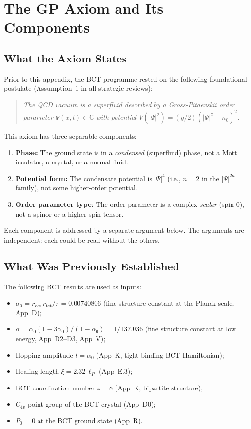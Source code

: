 \documentclass[11pt,a4paper]{article}
\theoremstyle{bctthm}
\theoremstyle{definition}
\begin{document}
\section{The GP Axiom and Its Components}

\subsection{What the Axiom States}

Prior to this appendix, the BCT programme rested on the following
foundational postulate (Assumption~1 in all strategic reviews):

\begin{quote}
\textit{The QCD vacuum is a superfluid described by a Gross-Pitaevskii
order parameter $\Psi(x,t) \in \mathbb{C}$ with potential
$V(|\Psi|^2) = (g/2)(|\Psi|^2 - n_0)^2$.}
\end{quote}

This axiom has three separable components:

\begin{enumerate}
\item \textbf{Phase:} The ground state is in a \emph{condensed} (superfluid)
phase, not a Mott insulator, a crystal, or a normal fluid.
\item \textbf{Potential form:} The condensate potential is $|\Psi|^4$
(i.e., $n=2$ in the $|\Psi|^{2n}$ family), not some higher-order potential.
\item \textbf{Order parameter type:} The order parameter is a complex
\emph{scalar} (spin-0), not a spinor or a higher-spin tensor.
\end{enumerate}

Each component is addressed by a separate argument below. The
arguments are independent: each could be read without the others.

\subsection{What Was Previously Established}

The following BCT results are used as inputs:
\begin{itemize}
\item $\alpha_0 = r_\mathrm{oct}\,r_\mathrm{tet}/\pi = 0.00740806$
(fine structure constant at the Planck scale, App~D);
\item $\alpha = \alpha_0(1-3\alpha_0)/(1-\alpha_0) = 1/137.036$
(fine structure constant at low energy, App~D2--D3, App~V);
\item Hopping amplitude $t = \alpha_0$ (App~K, tight-binding BCT Hamiltonian);
\item Healing length $\xi = 2.32\,\ell_P$ (App~E.3);
\item BCT coordination number $z = 8$ (App~K, bipartite structure);
\item $C_{4v}$ point group of the BCT crystal (App~D0);
\item $P_0 = 0$ at the BCT ground state (App~R).
\end{itemize}
\end{document}
